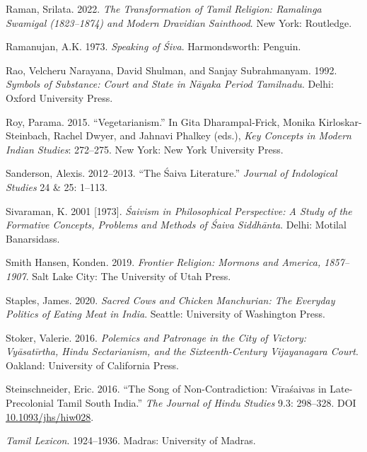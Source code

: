 \begin{hangparas}{0.125in}{1}
	\label{Raman2022}Raman, Srilata. 2022. \emph{The Transformation of Tamil Religion: Ramalinga Swamigal (1823–1874) and Modern Dravidian Sainthood}. New York: Routledge.\medskip


	\label{Ramanujan1973}Ramanujan, A.K. 1973. \emph{Speaking of Śiva}. Harmondsworth: Penguin.\medskip


	\label{Rao1992}Rao, Velcheru Narayana, David Shulman, and Sanjay Subrahmanyam. 1992. \emph{Symbols of Substance: Court and State in Nāyaka Period Tamilnadu}. Delhi: Oxford University Press.\medskip


	\label{Roy2015}Roy, Parama. 2015. “Vegetarianism.” In Gita Dharampal-Frick, Monika Kirloskar-Steinbach, Rachel Dwyer, and Jahnavi Phalkey (eds.), \emph{Key Concepts in Modern Indian Studies}: 272–275. New York: New York University Press.\medskip


	\label{Sanderson20122013}Sanderson, Alexis. 2012–2013. “The Śaiva Literature.” \emph{Journal of Indological Studies} 24 \& 25: 1–113.\medskip


	\label{Sivaraman2001}Sivaraman, K. 2001 [1973]. \emph{Śaivism in Philosophical Perspective: A Study of the Formative Concepts, Problems and Methods of Śaiva Siddhānta}. Delhi: Motilal Banarsidass.\medskip


	\label{SmithHansen2019}Smith Hansen, Konden. 2019. \emph{Frontier Religion: Mormons and America, 1857–1907}. Salt Lake City: The University of Utah Press.\medskip


	\label{Staples2020}Staples, James. 2020. \emph{Sacred Cows and Chicken Manchurian: The Everyday Politics of Eating Meat in India}. Seattle: University of Washington Press. \medskip


	\label{Stoker2016}Stoker, Valerie. 2016. \emph{Polemics and Patronage in the City of Victory: Vyāsatīrtha, Hindu Sectarianism, and the Sixteenth-Century Vijayanagara Court}. Oakland: University of California Press.\medskip


	\label{Steinschneider2016}Steinschneider, Eric. 2016. “The Song of Non-Contradiction: Vīraśaivas in Late-Precolonial Tamil South India.” \emph{The Journal of Hindu Studies} 9.3: 298–328. DOI \href{https://doi.org/10.1093/jhs/hiw028}{10.1093/jhs/hiw028}.\medskip


	\label{TamilLex}\emph{Tamil Lexicon}. 1924–1936. Madras: University of Madras.\medskip



\end{hangparas}
